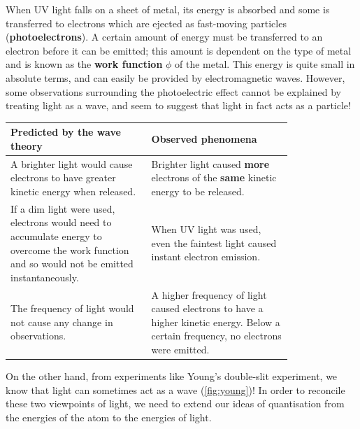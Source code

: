 \documentclass[a4paper]{amsbook}
\theoremstyle{definition}
\numberwithin{exercise}{chapter}
\numberwithin{exercise}{chapter}
\begin{document}
When UV light falls on a sheet of metal, its energy is absorbed and some is transferred to electrons which are ejected as fast-moving particles
(\textbf{photoelectrons}). A certain amount of energy must be transferred to an electron before it can be emitted; this amount is dependent on
the type of metal and is known as the \textbf{work function} $ \phi $ of the metal. This energy is quite small in absolute terms, and can easily
be provided by electromagnetic waves. However, some observations surrounding the photoelectric effect cannot be explained by treating light as a
wave, and seem to suggest that light in fact acts as a particle!

\begin{center}
  \def\arraystretch{1.5}
  \begin{tabular}{|p{0.4\linewidth}|p{0.4\linewidth}|}
    \hline
    \textbf{Predicted by the wave theory} & \textbf{Observed phenomena}\\\hline
    A brighter light would cause electrons to have greater kinetic energy when released. &
    Brighter light caused \textbf{more} electrons of the \textbf{same} kinetic energy to be released.\\\hline
    If a dim light were used, electrons would need to accumulate energy to overcome the work function and so would not be emitted instantaneously. &
    When UV light was used, even the faintest light caused instant electron emission.\\\hline
    The frequency of light would not cause any change in observations. &
    A higher frequency of light caused electrons to have a higher kinetic energy. Below a certain frequency,
    no electrons were emitted.\\\hline
  \end{tabular}
\end{center}

On the other hand, from experiments like Young's double-slit experiment, we know that light can sometimes act as a wave (\cref{fig:young})! In order
to reconcile these two viewpoints of light, we need to extend our ideas of quantisation from the energies of the atom to the energies of light.
\end{document}
